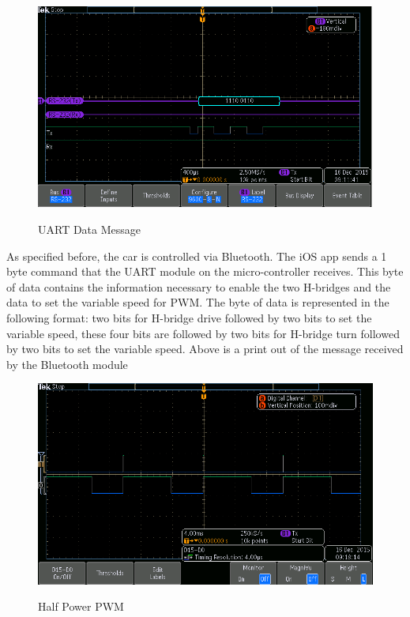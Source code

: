\documentclass[12pt]{article}
\begin{document}
\begin{figure}[H]
\begin {center}
\includegraphics[scale=.75]{uart-message}\\
\caption{UART Data Message}
\end {center}
\end{figure}

As specified before, the car is controlled via Bluetooth. The iOS app sends a 1 byte command that the UART module on the micro-controller receives. This byte of data contains the information necessary to enable the two H-bridges and the data to set the variable speed for PWM. The byte of data is represented in the following format: two bits for H-bridge drive followed by two bits to set the variable speed, these four bits are followed by two bits for H-bridge turn followed by two bits to set the variable speed. Above is a print out of the message received by the Bluetooth module \\


\begin{figure}[H]
\begin {center}
\includegraphics[scale=.75]{half-power}\\
\caption{Half Power PWM}
\end {center}
\end{figure}
\end{document}
